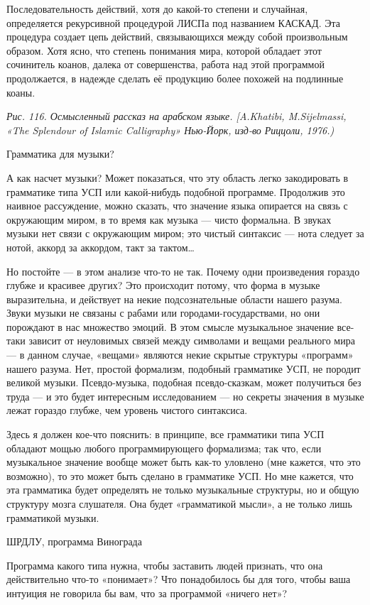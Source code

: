 \documentclass[../main.tex]{subfiles}
\begin{document}
Последовательность действий, хотя до какой-то степени и случайная, определяется рекурсивной процедурой ЛИСПа под названием КАСКАД. Эта процедура создает цепь действий, связывающихся между собой произвольным образом. Хотя ясно, что степень понимания мира, которой обладает этот сочинитель коанов, далека от совершенства, работа над этой программой продолжается, в надежде сделать её продукцию более похожей на подлинные коаны.

\emph{Рис. 116. Осмысленный рассказ на арабском языке. {[}A.Khatibi, M.Sijelmassi, «The Splendour of Islamic Calligraphy» Нью-Йорк, изд-во Риццоли, 1976.)}

Грамматика для музыки?

А как насчет музыки? Может показаться, что эту область легко закодировать в грамматике типа УСП или какой-нибудь подобной программе. Продолжив это наивное рассуждение, можно сказать, что значение языка опирается на связь с окружающим миром, в то время как музыка --- чисто формальна. В звуках музыки нет связи с окружающим миром; это чистый синтаксис --- нота следует за нотой, аккорд за аккордом, такт за тактом\ldots{}

Но постойте --- в этом анализе что-то не так. Почему одни произведения гораздо глубже и красивее других? Это происходит потому, что форма в музыке выразительна, и действует на некие подсознательные области нашего разума. Звуки музыки не связаны с рабами или городами-государствами, но они порождают в нас множество эмоций. В этом смысле музыкальное значение все-таки зависит от неуловимых связей между символами и вещами реального мира --- в данном случае, «вещами» являются некие скрытые структуры «программ» нашего разума. Нет, простой формализм, подобный грамматике УСП, не породит великой музыки. Псевдо-музыка, подобная псевдо-сказкам, может получиться без труда --- и это будет интересным исследованием --- но секреты значения в музыке лежат гораздо глубже, чем уровень чистого синтаксиса.

Здесь я должен кое-что пояснить: в принципе, все грамматики типа УСП обладают мощью любого программирующего формализма; так что, если музыкальное значение вообще может быть как-то уловлено (мне кажется, что это возможно), то это может быть сделано в грамматике УСП. Но мне кажется, что эта грамматика будет определять не только музыкальные структуры, но и общую структуру мозга слушателя. Она будет «грамматикой мысли», а не только лишь грамматикой музыки.

ШРДЛУ, программа Винограда

Программа какого типа нужна, чтобы заставить людей признать, что она действительно что-то «понимает»? Что понадобилось бы для того, чтобы ваша интуиция не говорила бы вам, что за программой «ничего нет»?
\end{document}
